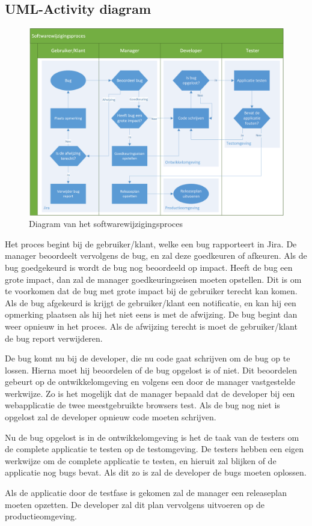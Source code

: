 \documentclass[12pt]{article}
\begin{document}
\subsection{UML-Activity diagram}
\begin{figure}[H]
	\includegraphics[width=\textwidth]{images/UMLActivityDiagram.png}
	\caption{Diagram van het softwarewijzigingsproces}
\end{figure}
Het proces begint bij de gebruiker/klant, welke een bug rapporteert in Jira. De manager beoordeelt vervolgens de bug, en zal deze goedkeuren of afkeuren. Als de bug goedgekeurd is wordt de bug nog beoordeeld op impact. Heeft de bug een grote impact, dan zal de manager goedkeuringseisen moeten opstellen. Dit is om te voorkomen dat de bug met grote impact bij de gebruiker terecht kan komen. Als de bug afgekeurd is krijgt de gebruiker/klant een notificatie, en kan hij een opmerking plaatsen als hij het niet eens is met de afwijzing. De bug begint dan weer opnieuw in het proces. Als de afwijzing terecht is moet de gebruiker/klant de bug report verwijderen.

De bug komt nu bij de developer, die nu code gaat schrijven om de bug op te lossen. Hierna moet hij beoordelen of de bug opgelost is of niet. Dit beoordelen gebeurt op de ontwikkelomgeving en volgens een door de manager vastgestelde werkwijze. Zo is het mogelijk dat de manager bepaald dat de developer bij een webapplicatie de twee meestgebruikte browsers test. Als de bug nog niet is opgelost zal de developer opnieuw code moeten schrijven.

Nu de bug opgelost is in de ontwikkelomgeving is het de taak van de testers om de complete applicatie te testen op de testomgeving. De testers hebben een eigen werkwijze om de complete applicatie te testen, en hieruit zal blijken of de applicatie nog bugs bevat. Als dit zo is zal de developer de bugs moeten oplossen.

Als de applicatie door de testfase is gekomen zal de manager een releaseplan moeten opzetten. De developer zal dit plan vervolgens uitvoeren op de productieomgeving.
\end{document}
